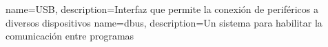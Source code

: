 {
	name=USB,
	description={Interfaz que permite la conexión de periféricos a diversos dispositivos}
}
{
	name=dbus,
	description={Un sistema para habilitar la comunicación entre programas}
}
